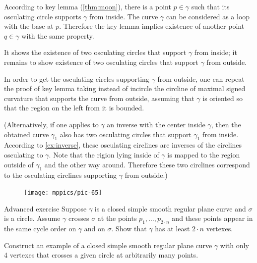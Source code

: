According to key lemma (\ref{thm:moon}), there is a point $p\in\gamma$ such that its osculating circle supports $\gamma$ from inside.
The curve $\gamma$ can be considered as a loop with the base at $p$.
Therefore the key lemma implies existence of another point $q\in\gamma$ with the same property.

It shows the existence of two osculating circles that support $\gamma$ from inside;
it remains to show existence of two osculating circles that support $\gamma$ from outside.

In order to get the osculating circles supporting $\gamma$ from outside, one can repeat the proof of key lemma taking instead of incircle the circline of maximal signed curvature that supports the curve from outside, assuming that $\gamma$ is oriented so that the region on the left from it is bounded.%

(Alternatively, if one applies to $\gamma$ an inverse with the center inside $\gamma$, then the obtained curve $\gamma_1$ also has  two osculating circles that support $\gamma_1$ from inside.
According to \ref{ex:inverse}, these osculating circlines are inverses of the circlines osculating to $\gamma$.
Note that the rigion lying inside of $\gamma$ is mapped to the region outside of $\gamma_1$ and the other way around.
Therefore these two circlines correspond to the osculating circlines supporting $\gamma$ from outside.)
\qeds

\begin{figure}
\vskip-7mm
\centering
\texttt{[image: mppics/pic-65]}
\vskip0mm
\end{figure}

\begin{thm}{Advanced exercise}\label{ex:curve-crosses-circle}
Suppose $\gamma$ is a closed simple smooth regular plane curve and $\sigma$ is a circle.
Assume $\gamma$ crosses $\sigma$ at the points $p_1,\dots,p_{2{\cdot} n}$ and these points appear in the same cycle order on $\gamma$ and on $\sigma$.
Show that $\gamma$ has at least $2\cdot n$ vertexes.

Construct an example of a closed simple smooth regular plane curve $\gamma$ with only 4 vertexes that crosses a given circle at arbitrarily many points. 
\end{thm}

